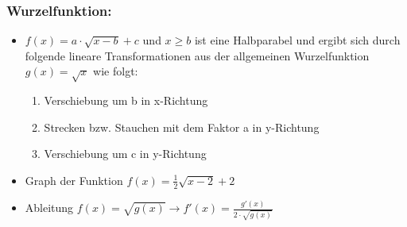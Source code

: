 \documentclass[a4paper,twocolumn,10pt]{onepgnote1}
\begin{document}
 \subsubsection{Wurzelfunktion:}
 \begin{itemize}
 \item $f(x) = a\cdot \sqrt{x-b}+c$ und $x\geq b$ ist eine Halbparabel und ergibt sich durch folgende lineare Transformationen aus der allgemeinen Wurzelfunktion $g(x)= \sqrt{x}$ wie folgt:\\
\begin{enumerate}
    \item Verschiebung um b in x-Richtung\\
    \item Strecken bzw. Stauchen mit dem Faktor a in y-Richtung\\
    \item Verschiebung um c in y-Richtung
\end{enumerate}
\item Graph der Funktion $f(x)= \frac{1}{2} \sqrt{x-2}+2$\\
\item Ableitung $f(x)= \sqrt{g(x)} \longrightarrow f'(x) = \frac{g'(x)}{2\cdot \sqrt{g(x)}}$
 \end{itemize}
\end{document}
